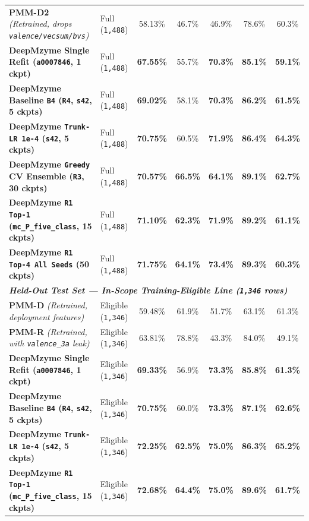 \documentclass[10pt,a4paper,twocolumn]{article}
\begin{document}
\begin{table}[t!]
\begin{tabular}{llccccc}
    \textbf{PMM-D2} \textit{(Retrained, drops \texttt{valence/vecsum/bvs})} & Full (\texttt{1,488}) & 58.13\% & 46.7\% & 46.9\% & 78.6\% & 60.3\% \\
    \textbf{DeepMzyme Single Refit (\texttt{a0007846}, 1 ckpt)} & Full (\texttt{1,488}) & \textbf{67.55\%} & 55.7\% & \textbf{70.3\%} & \textbf{85.1\%} & \textbf{59.1\%} \\
    \textbf{DeepMzyme Baseline \texttt{B4} (\texttt{R4}, \texttt{s42}, 5 ckpts)} & Full (\texttt{1,488}) & \textbf{69.02\%} & 58.1\% & \textbf{70.3\%} & \textbf{86.2\%} & \textbf{61.5\%} \\
    \textbf{DeepMzyme \texttt{Trunk-LR 1e-4} (\texttt{s42}, 5 ckpts)} & Full (\texttt{1,488}) & \textbf{70.75\%} & 60.5\% & \textbf{71.9\%} & \textbf{86.4\%} & \textbf{64.3\%} \\
    \textbf{DeepMzyme \texttt{Greedy} CV Ensemble (\texttt{R3}, 30 ckpts)} & Full (\texttt{1,488}) & \textbf{70.57\%} & \textbf{66.5\%} & \textbf{64.1\%} & \textbf{89.1\%} & \textbf{62.7\%} \\
    \textbf{DeepMzyme \texttt{R1 Top-1} (\texttt{mc\_P\_five\_class}, 15 ckpts)} & Full (\texttt{1,488}) & \textbf{71.10\%} & \textbf{62.3\%} & \textbf{71.9\%} & \textbf{89.2\%} & \textbf{61.1\%} \\
    \textbf{DeepMzyme \texttt{R1 Top-4 All Seeds} (50 ckpts)} & Full (\texttt{1,488}) & \textbf{71.75\%} & \textbf{64.1\%} & \textbf{73.4\%} & \textbf{89.3\%} & \textbf{60.3\%} \\
    \midrule
    \multicolumn{7}{l}{\textit{\textbf{Held-Out Test Set --- In-Scope Training-Eligible Line (\texttt{1,346} rows)}}} \\
    \textbf{PMM-D} \textit{(Retrained, deployment features)} & Eligible (\texttt{1,346}) & 59.48\% & 61.9\% & 51.7\% & 63.1\% & 61.3\% \\
    \textbf{PMM-R} \textit{(Retrained, with \texttt{valence\_3a} leak)} & Eligible (\texttt{1,346}) & 63.81\% & 78.8\% & 43.3\% & 84.0\% & 49.1\% \\
    \textbf{DeepMzyme Single Refit (\texttt{a0007846}, 1 ckpt)} & Eligible (\texttt{1,346}) & \textbf{69.33\%} & 56.9\% & \textbf{73.3\%} & \textbf{85.8\%} & \textbf{61.3\%} \\
    \textbf{DeepMzyme Baseline \texttt{B4} (\texttt{R4}, \texttt{s42}, 5 ckpts)} & Eligible (\texttt{1,346}) & \textbf{70.75\%} & 60.0\% & \textbf{73.3\%} & \textbf{87.1\%} & \textbf{62.6\%} \\
    \textbf{DeepMzyme \texttt{Trunk-LR 1e-4} (\texttt{s42}, 5 ckpts)} & Eligible (\texttt{1,346}) & \textbf{72.25\%} & \textbf{62.5\%} & \textbf{75.0\%} & \textbf{86.3\%} & \textbf{65.2\%} \\
    \textbf{DeepMzyme \texttt{R1 Top-1} (\texttt{mc\_P\_five\_class}, 15 ckpts)} & Eligible (\texttt{1,346}) & \textbf{72.68\%} & \textbf{64.4\%} & \textbf{75.0\%} & \textbf{89.6\%} & \textbf{61.7\%} \\
    \bottomrule
  \end{tabular}
\end{table}
\end{document}
